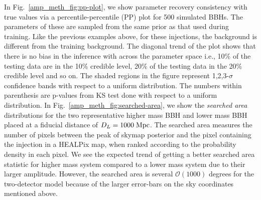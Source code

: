 \begin{refsection}
In Fig.~\ref{amp_meth_fig:pp-plot}, we show parameter recovery consistency with true values via a percentile-percentile (PP) plot for 500 simulated BBHs. 
The parameters of these are sampled from the same prior as that used during training.
Like the previous examples above, for these injections, the background is different from the training background.
The diagonal trend of the plot shows that there is no bias in the inference with {\amplfi} across the parameter space i.e., 10\% of the testing data are in the 10\% credible level, 20\% of the testing data in the 20\% credible level and so on. 
The shaded regions in the figure represent 1,2,3-$\sigma$ confidence bands with respect to a uniform distribution. 
The numbers within parenthesis are p-values from KS test done with respect to a uniform distribution.
In Fig.~\ref{amp_meth_fig:searched-area}, we show the \emph{searched area} distributions for the two representative higher mass BBH and lower mass BBH placed at a fiducial distance of $D_L = 1000\;\mathrm{Mpc}$. 
The searched area measures the number of pixels between the peak of skymap posterior and the pixel containing the injection in a HEALPix map, when ranked according to the probability density in each pixel. 
We see the expected trend of getting a better searched area statistic for higher mass system compared to a lower mass system due to their larger amplitude. 
However, the searched area is several $\mathcal{O}(1000)$ degrees for the two-detector model because of the larger error-bars on the sky coordinates mentioned above.


\end{refsection}
